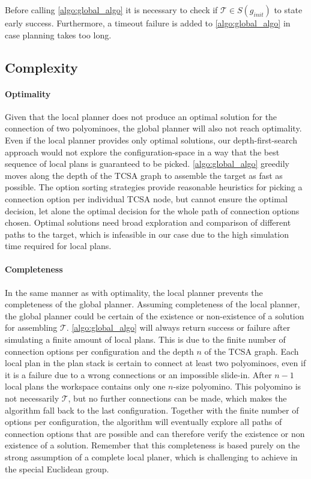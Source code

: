 Before calling \autoref{algo:global_algo} it is necessary to check if $\mathcal{T} \in S(g_\textit{init})$ to state early success.
Furthermore, a timeout failure is added to \autoref{algo:global_algo} in case planning takes too long.
 
\subsection{Complexity}
\label{sec:global_complex}

\paragraph{Optimality}

Given that the local planner does not produce an optimal solution for the connection of two polyominoes, the global planner will also not reach optimality.
Even if the local planner provides only optimal solutions, our depth-first-search approach would not explore the configuration-space in a way that the best sequence of local plans is guaranteed to be picked.
\autoref{algo:global_algo} greedily moves along the depth of the TCSA graph to assemble the target as fast as possible.
The option sorting strategies provide reasonable heuristics for picking a connection option per individual TCSA node, but cannot ensure the optimal decision, let alone the optimal decision for the whole path of connection options chosen.
Optimal solutions need broad exploration and comparison of different paths to the target, which is infeasible in our case due to the high simulation time required for local plans.

\paragraph{Completeness}

In the same manner as with optimality, the local planner prevents the completeness of the global planner.
Assuming completeness of the local planner, the global planner could be certain of the existence or non-existence of a solution for assembling $\mathcal{T}$.
\autoref{algo:global_algo} will always return success or failure after simulating a finite amount of local plans.
This is due to the finite number of connection options per configuration and the depth $n$ of the TCSA graph.
Each local plan in the plan stack is certain to connect at least two polyominoes, even if it is a failure due to a wrong connections or an impossible slide-in.
After $n-1$ local plans the workspace contains only one $n$-size polyomino.
This polyomino is not necessarily $\mathcal{T}$, but no further connections can be made, which makes the algorithm fall back to the last configuration.
Together with the finite number of options per configuration, the algorithm will eventually explore all paths of connection options that are possible and can therefore verify the existence or non existence of a solution.
Remember that this completeness is based purely on the strong assumption of a complete local planer, which is challenging to achieve in the special Euclidean group.

